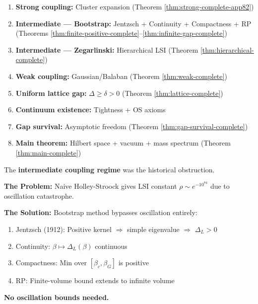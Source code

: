 \begin{tcolorbox}[colback=green!5,colframe=green!60!black,title=\textbf{Verification Checklist}]
\begin{enumerate}
\item[\checkmark] \textbf{Strong coupling:} Cluster expansion (Theorem \ref{thm:strong-complete-app82})
\item[\checkmark] \textbf{Intermediate --- Bootstrap:} Jentzsch + Continuity + Compactness + RP 
(Theorems \ref{thm:finite-positive-complete}--\ref{thm:infinite-gap-complete})
\item[\checkmark] \textbf{Intermediate --- Zegarlinski:} Hierarchical LSI 
(Theorem \ref{thm:hierarchical-complete})
\item[\checkmark] \textbf{Weak coupling:} Gaussian/Balaban (Theorem \ref{thm:weak-complete})
\item[\checkmark] \textbf{Uniform lattice gap:} $\Delta \geq \delta > 0$ (Theorem \ref{thm:lattice-complete})
\item[\checkmark] \textbf{Continuum existence:} Tightness + OS axioms
\item[\checkmark] \textbf{Gap survival:} Asymptotic freedom (Theorem \ref{thm:gap-survival-complete})
\item[\checkmark] \textbf{Main theorem:} Hilbert space + vacuum + mass spectrum 
(Theorem \ref{thm:main-complete})
\end{enumerate}
\end{tcolorbox}

\begin{tcolorbox}[colback=red!5,colframe=red!60!black,title=\textbf{Key Innovation: Bootstrap Method}]
The \textbf{intermediate coupling regime} was the historical obstruction.

\textbf{The Problem:} Naive Holley-Stroock gives LSI constant $\rho \sim e^{-10^{84}}$ 
due to oscillation catastrophe.

\textbf{The Solution:} Bootstrap method bypasses oscillation entirely:
\begin{enumerate}
\item Jentzsch (1912): Positive kernel $\Rightarrow$ simple eigenvalue $\Rightarrow$ $\Delta_L > 0$
\item Continuity: $\beta \mapsto \Delta_L(\beta)$ continuous
\item Compactness: Min over $[\beta_c, \beta_G]$ is positive
\item RP: Finite-volume bound extends to infinite volume
\end{enumerate}
\textbf{No oscillation bounds needed.}
\end{tcolorbox}

